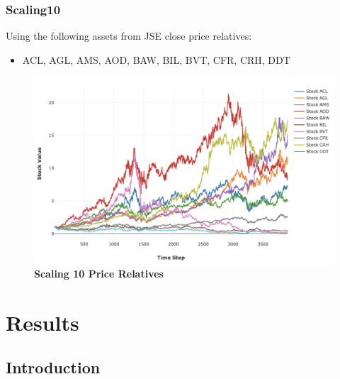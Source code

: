 \documentclass[a4paper,11pt,oneside]{article}
\theoremstyle{plain}
\theoremstyle{definition}
\begin{document}
	
	\subsubsection{Scaling10}\label{dataset_scaling10}
	
	Using the following assets from JSE close price relatives:
	
	\begin{itemize}
		\item ACL, AGL, AMS, AOD, BAW, BIL, BVT, CFR, CRH, DDT
	\end{itemize}
	
	\begin{figure}[H]
		\centering
		\includegraphics[scale=0.45]{images/results/prices/scaling10_prices.png} 
		\caption[Scaling 10 Prices]{\textbf{Scaling 10 Price Relatives}}
		\label{figure-scaling0_prices}
	\end{figure}
	
	
	
	
	
	
	
	
	
	
	\newpage
	\section{Results}\label{Results}
	\subsection{Introduction}
	
\end{document}
